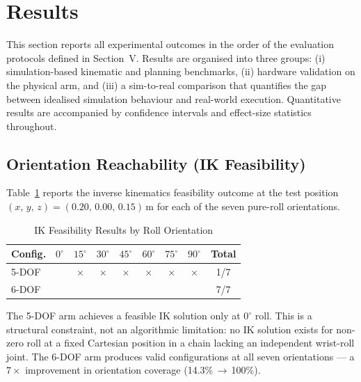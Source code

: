 \documentclass[conference]{IEEEtran}
\begin{document}
	\section{Results}
	\label{sec:results}
	
	This section reports all experimental outcomes in the order of the
	evaluation protocols defined in Section~V. Results are organised
	into three groups: (i) simulation-based kinematic and planning
	benchmarks, (ii) hardware validation on the physical arm, and
	(iii) a sim-to-real comparison that quantifies the gap between
	idealised simulation behaviour and real-world execution.
	Quantitative results are accompanied by confidence intervals and
	effect-size statistics throughout.
	
	\subsection{Orientation Reachability (IK Feasibility)}
	
	Table~\ref{tab:ik_results} reports the inverse kinematics feasibility
	outcome at the test position
	$(x,\,y,\,z) = (0.20,\,0.00,\,0.15)$\,m for each of the seven
	pure-roll orientations.
	
	\begin{table}[t]
		\centering
		\caption{IK Feasibility Results by Roll Orientation}
		\label{tab:ik_results}
		\renewcommand{\arraystretch}{1.2}
		\small
		\begin{tabular}{lcccccccc}
			\toprule
			\textbf{Config.} & $0^\circ$ & $15^\circ$ & $30^\circ$ & $45^\circ$ & $60^\circ$ & $75^\circ$ & $90^\circ$ & \textbf{Total} \\
			\midrule
			5-DOF & \checkmark & $\times$ & $\times$ & $\times$ & $\times$ & $\times$ & $\times$ & 1/7 \\
			6-DOF & \checkmark & \checkmark & \checkmark & \checkmark & \checkmark & \checkmark & \checkmark & 7/7 \\
			\bottomrule
		\end{tabular}
	\end{table}
	
	The 5-DOF arm achieves a feasible IK solution only at $0^\circ$
	roll. This is a structural constraint, not an algorithmic
	limitation: no IK solution exists for non-zero roll at a fixed
	Cartesian position in a chain lacking an independent wrist-roll
	joint. The 6-DOF arm produces valid configurations at all seven
	orientations — a $7\times$ improvement in orientation coverage
	(14.3\%\,$\rightarrow$\,100\%).
	
\end{document}
